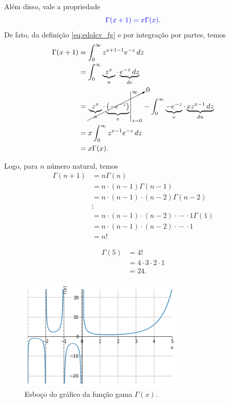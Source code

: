 Além disso, vale a propriedade
\begin{equation}\label{eq:edolcv_fgp1}
  {\color{blue}\Gamma(x+1) = x\Gamma(x)}.
\end{equation}
De fato, da definição \eqref{eq:edolcv_fg} e por integração por partes, temos
\begin{align}
  \Gamma(x+1) &= \int_0^\infty z^{x+1-1}e^{-z}\,dz\\
              &= \int_0^\infty \underbrace{z^x}_{u}\cdot \underbrace{e^{-z}\,dz}_{dv}\\
              &= \cancelto{0}{\left.\underbrace{z^x}_{u}\cdot\underbrace{\left(-e^{-z}\right)}_{v}\right|_{z=0}^\infty} - \int_{0}^\infty \underbrace{-e^{-z}}_{v}\cdot \underbrace{xz^{x-1}\,dz}_{du}\\
              &= x\int_0^\infty z^{x-1}e^{-z}\,dz\\
              &= x\Gamma(x).
\end{align}

Logo, para $n$ número natural, temos
\begin{align}
  \Gamma(n+1) &= n\Gamma(n)\\
              &=n\cdot (n-1)\Gamma(n-1)\\
              &=n\cdot (n-1)\cdot (n-2)\Gamma(n-2)\\
              &\vdots\\
              &= n\cdot (n-1)\cdot (n-2)\cdot\, \cdots\, \cdot 1\Gamma(1)\\
              &= n\cdot (n-1)\cdot (n-2)\cdot\, \cdots\, \cdot 1 \\
              &= n!
\end{align}

\begin{ex}
  \begin{align}
    \Gamma(5) &= 4! \\
              &= 4\cdot 3\cdot 2\cdot 1 \\
              &= 24.
  \end{align}
\end{ex}

\begin{figure}[H]
  \centering
  \includegraphics[width=0.7\textwidth]{cap_edolcv/dados/fig_edolcv_fg/fig}
  \caption{Esboço do gráfico da função gama $\Gamma(x)$.}
  \label{fig:edolcv_fg}
\end{figure}

